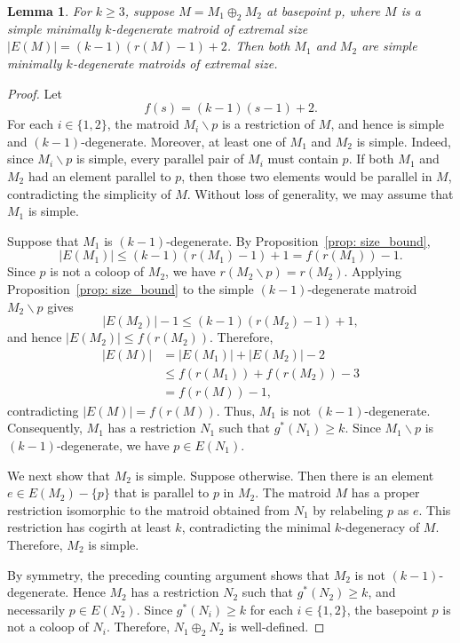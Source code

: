\documentclass{amsart}
\newcommand{\ba}{\backslash}
\newtheorem{lemma}[theorem]{Lemma}
\theoremstyle{definition}
\theoremstyle{remark}
\numberwithin{equation}{section}
\begin{document}
\begin{lemma}
\label{lem: 2-sum_components_extremal}
For $k \ge 3$, suppose $M = M_1 \oplus_2 M_2$ at basepoint $p$, where $M$ is a simple minimally $k$-degenerate matroid of extremal size $|E(M)| = (k-1)(r(M)-1)+2$. Then both $M_1$ and $M_2$ are simple minimally $k$-degenerate matroids of extremal size.
\end{lemma}

\begin{proof}
Let
\[
    f(s)=(k-1)(s-1)+2.
\]
For each $i\in\{1,2\}$, the matroid $M_i\ba p$ is a restriction of $M$, and hence is simple and $(k-1)$-degenerate. Moreover, at least one of $M_1$ and $M_2$ is simple. Indeed, since $M_i\ba p$ is simple, every parallel pair of $M_i$ must contain $p$. If both $M_1$ and $M_2$ had an element parallel to $p$, then those two elements would be parallel in $M$, contradicting the simplicity of $M$. Without loss of generality, we may assume that $M_1$ is simple.

Suppose that $M_1$ is $(k-1)$-degenerate. By Proposition~\ref{prop: size_bound},
\[
    |E(M_1)|\leq (k-1)(r(M_1)-1)+1=f(r(M_1))-1.
\]
Since $p$ is not a coloop of $M_2$, we have $r(M_2\ba p)=r(M_2)$. Applying Proposition~\ref{prop: size_bound} to the simple $(k-1)$-degenerate matroid $M_2\ba p$ gives
\[
    |E(M_2)|-1\leq (k-1)(r(M_2)-1)+1,
\]
and hence $|E(M_2)|\leq f(r(M_2))$. Therefore,
\begin{align*}
    |E(M)|
    &=|E(M_1)|+|E(M_2)|-2\\
    &\leq f(r(M_1))+f(r(M_2))-3\\
    &=f(r(M))-1,
\end{align*}
contradicting $|E(M)|=f(r(M))$. Thus, $M_1$ is not $(k-1)$-degenerate. Consequently, $M_1$ has a restriction $N_1$ such that $g^*(N_1)\geq k$. Since $M_1\ba p$ is $(k-1)$-degenerate, we have $p\in E(N_1)$.

We next show that $M_2$ is simple. Suppose otherwise. Then there is an element $e\in E(M_2)-\{p\}$ that is parallel to $p$ in $M_2$. The matroid $M$ has a proper restriction isomorphic to the matroid obtained from $N_1$ by relabeling $p$ as $e$. This restriction has cogirth at least $k$, contradicting the minimal $k$-degeneracy of $M$. Therefore, $M_2$ is simple.

By symmetry, the preceding counting argument shows that $M_2$ is not $(k-1)$-degenerate. Hence $M_2$ has a restriction $N_2$ such that $g^*(N_2)\geq k$, and necessarily $p\in E(N_2)$. Since $g^*(N_i) \geq k$ for each $i \in \{1,2\}$, the basepoint $p$ is not a coloop of $N_i$. Therefore, $N_1\oplus_2 N_2$ is well-defined.


\end{proof}
\end{document}
